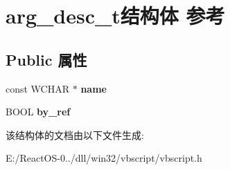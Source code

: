 \hypertarget{structarg__desc__t}{}\section{arg\+\_\+desc\+\_\+t结构体 参考}
\label{structarg__desc__t}
\subsection*{Public 属性}
\begin{DoxyCompactItemize}
\item 
\mbox{\label{structarg__desc__t_a31166c02a7d0efbb97045915cb60863c}} 
const W\+C\+H\+AR $\ast$ {\bfseries name}
\item 
\mbox{\label{structarg__desc__t_a91b235ba5ebaad84dfdb03c7acde2c80}} 
B\+O\+OL {\bfseries by\+\_\+ref}
\end{DoxyCompactItemize}


该结构体的文档由以下文件生成\+:\begin{DoxyCompactItemize}
\item 
E\+:/\+React\+O\+S-\/0../dll/win32/vbscript/vbscript.\+h\end{DoxyCompactItemize}
